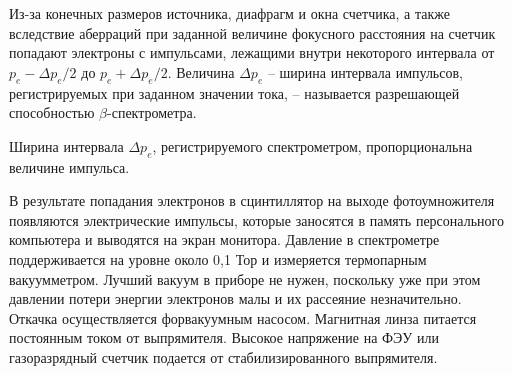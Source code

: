 	Из-за конечных размеров источника, диафрагм и окна счетчика, а также вследствие аберраций при заданной величине фокусного расстояния на счетчик попадают электроны с импульсами, лежащими внутри некоторого интервала от $p_e - \Delta p_e/2$ до $p_e + \Delta p_e/2$. Величина $\Delta p_e$ -- ширина интервала импульсов, регистрируемых при заданном значении тока, -- называется разрешающей способностью $\beta$-спектрометра.
	
	Ширина интервала $\Delta p_e$, регистрируемого спектрометром, пропорциональна величине импульса.
	
	В результате попадания электронов в сцинтиллятор на выходе фотоумножителя появляются электрические импульсы, которые заносятся в память персонального компьютера и выводятся на экран монитора. Давление в спектрометре поддерживается на уровне около 0,1 Тор и измеряется термопарным вакуумметром. Лучший вакуум в приборе не нужен, поскольку уже при этом давлении потери энергии электронов малы и их рассеяние незначительно. Откачка осуществляется форвакуумным насосом. Магнитная линза питается постоянным током от выпрямителя. Высокое напряжение на ФЭУ или газоразрядный счетчик подается от стабилизированного выпрямителя.
	
